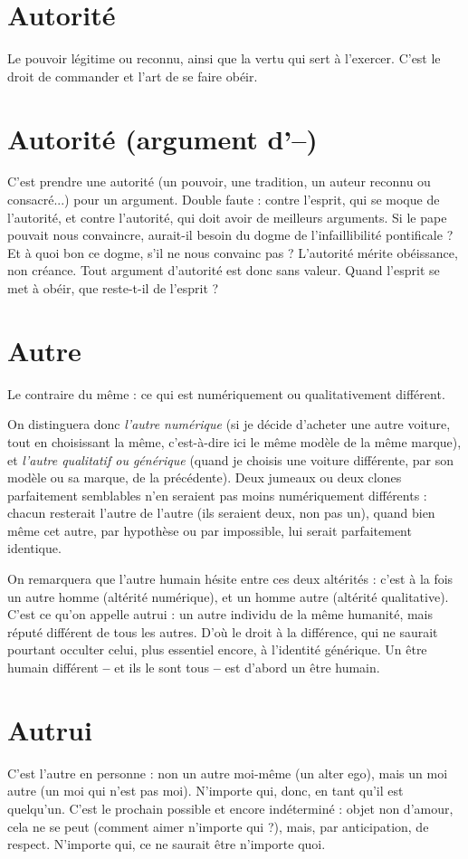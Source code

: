 \section{Autorité}
Le pouvoir légitime ou reconnu, ainsi que la vertu qui sert à
l'exercer. C’est le droit de commander et l’art de se faire obéir.

\section{Autorité (argument d’{\bf --})}
C'est prendre une autorité (un pouvoir, une
tradition, un auteur reconnu ou consacré...)
pour un argument. Double faute : contre l’esprit, qui se moque de
l'autorité, et contre l'autorité, qui doit avoir de meilleurs arguments. Si le pape
pouvait nous convaincre, aurait-il besoin du dogme de l'infaillibilité
pontificale ? Et à quoi bon ce dogme, s’il ne nous convainc pas ?
L'autorité mérite obéissance, non créance. Tout argument d’autorité est
donc sans valeur. Quand l'esprit se met à obéir, que reste-t-il de l'esprit ?

\section{Autre}
Le contraire du même : ce qui est numériquement ou qualitativement différent.

On distinguera donc {\it l'autre numérique} (si je décide d’acheter une autre voiture,
tout en choisissant la même, c’est-à-dire ici le même modèle de la même
marque), et {\it l'autre qualitatif ou générique} (quand je choisis une voiture différente,
par son modèle ou sa marque, de la précédente). Deux jumeaux ou deux
clones parfaitement semblables n’en seraient pas moins numériquement
différents : chacun resterait l’autre de l’autre (ils seraient deux, non pas un),
quand bien même cet autre, par hypothèse ou par impossible, lui serait parfaitement
identique.

On remarquera que l’autre humain hésite entre ces deux altérités : c’est à
la fois un autre homme (altérité numérique), et un homme autre (altérité
qualitative). C’est ce qu’on appelle autrui : un autre individu de la même
humanité, mais réputé différent de tous les autres. D’où le droit à la différence,
qui ne saurait pourtant occulter celui, plus essentiel encore, à l’identité
générique. Un être humain différent {\bf --} et ils le sont tous {\bf --} est d’abord un être
humain.

\section{Autrui}
C'est l’autre en personne : non un autre moi-même (un alter ego),
mais un moi autre (un moi qui n’est pas moi). N’importe qui,
donc, en tant qu’il est quelqu'un.
C’est le prochain possible et encore indéterminé : objet non d’amour, cela
ne se peut (comment aimer n’importe qui ?), mais, par anticipation, de respect.
N'importe qui, ce ne saurait être n’importe quoi.

